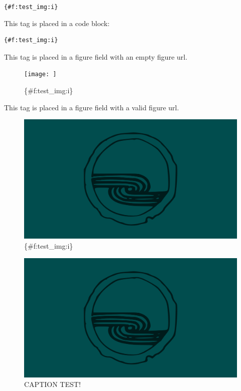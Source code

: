 \documentclass[
]{article}
\begin{document}
\texttt{\{\#f:test\_img:i\}}

This tag is placed in a code block:

\begin{verbatim}
{#f:test_img:i}
\end{verbatim}

This tag is placed in a figure field with an empty figure url.

\begin{figure}
\centering
\texttt{[image: ]}
\caption{\{\#f:test\_img:i\}}
\end{figure}

This tag is placed in a figure field with a valid figure url.

\begin{figure}
\centering
\includegraphics{Figures/test_img.png}
\caption{\{\#f:test\_img:i\}}
\end{figure}

\begin{figure}
\centering
\includegraphics{Figures/test_img.png}
\caption{CAPTION TEST!}
\end{figure}
\end{document}
